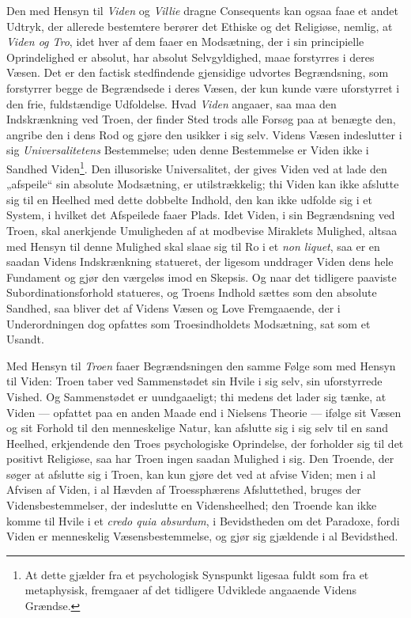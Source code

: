 \documentclass[12pt,a4paper]{book}
\newcommand{\opage}[1]{\marginnote{\footnotesize\textit{[#1]}}}
\begin{document}
Den med Hensyn til \emph{Viden} og \emph{Villie} dragne Consequents kan ogsaa faae et andet Udtryk, der
allerede bestemtere berører det Ethiske og det Religiøse, nemlig, at \emph{Viden og Tro}, idet hver af
dem faaer en Modsætning, der i sin principielle Oprindelighed er absolut, har absolut
Selvgyldighed, maae forstyrres i deres Væsen. Det er den factisk stedfindende gjensidige udvortes
Begrændsning, som forstyrrer begge de Begrændsede i deres Væsen, der kun kunde være uforstyrret i
den frie, fuldstændige Udfoldelse. Hvad \emph{Viden} angaaer, saa maa den Indskrænkning ved Troen, der
finder Sted trods alle Forsøg paa at benægte den, angribe den i dens Rod og gjøre den usikker i
sig selv. Videns Væsen indeslutter i sig \emph{Universalitetens} Bestemmelse; uden denne
Bestemmelse er Viden ikke i Sandhed Viden\footnote{At dette gjælder fra et psychologisk
Synspunkt ligesaa fuldt som fra et metaphysisk, fremgaaer af det tidligere Udviklede angaaende
Videns Grændse.}. Den illusoriske Universalitet, der gives Viden ved at lade den „afspeile“ sin
absolute Modsætning, er utilstrækkelig; thi Viden kan ikke afslutte sig til en Heelhed med dette
dobbelte Indhold, den kan ikke udfolde sig i et System, i hvilket det Afspeilede faaer Plads.
Idet Viden, \opage{195}i sin Begrændsning ved Troen, skal anerkjende Umuligheden af at modbevise Miraklets
Mulighed, altsaa med Hensyn til denne Mulighed skal slaae sig til Ro i et \textit{non liquet},
saa er en saadan Videns Indskrænkning statueret, der ligesom unddrager Viden dens hele Fundament
og gjør den værgeløs imod en Skepsis. Og naar det tidligere paaviste Subordinationsforhold
statueres, og Troens Indhold sættes som den absolute Sandhed, saa bliver det af Videns Væsen og
Love Fremgaaende, der i Underordningen dog opfattes som Troesindholdets Modsætning, sat som et
Usandt.

Med Hensyn til \emph{Troen} faaer Begrændsningen den samme Følge som med Hensyn til Viden: Troen taber
ved Sammenstødet sin Hvile i sig selv, sin uforstyrrede Vished. Og Sammenstødet er uundgaaeligt;
thi medens det lader sig tænke, at Viden --- opfattet paa en anden Maade end i Nielsens Theorie
--- ifølge sit Væsen og sit Forhold til den menneskelige Natur, kan afslutte sig i sig selv til
en sand Heelhed, erkjendende den Troes psychologiske Oprindelse, der forholder sig til det
positivt Religiøse, saa har Troen ingen saadan Mulighed i sig. Den Troende, der søger at afslutte
sig i Troen, kan kun gjøre det ved at afvise Viden; men i al Afvisen af Viden, i al Hævden af
Troessphærens Afsluttethed, bruges der Vidensbestemmelser, der indeslutte en Vidensheelhed; den
Troende kan ikke komme til Hvile i et \textit{credo quia absurdum}, i Bevidstheden om det
Paradoxe, fordi Viden er menneskelig Væsensbestemmelse, og gjør sig gjældende i al Bevidsthed.
\end{document}
